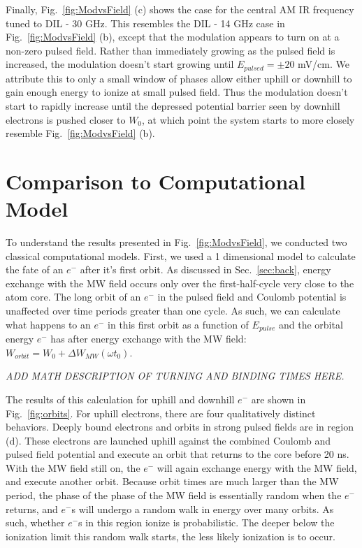 \documentclass[aps,pra,preprint,groupedaddress]{revtex4-1}
\begin{document}
Finally, Fig.~\ref{fig:ModvsField} (c) shows the case for the central AM IR frequency tuned to DIL - 30 GHz. This resembles the DIL - 14 GHz case in Fig.~\ref{fig:ModvsField} (b), except that the modulation appears to turn on at a non-zero pulsed field. Rather than immediately growing as the pulsed field is increased, the modulation doesn't start growing until $E_{pulsed} = \pm 20$ mV/cm. We attribute this to only a small window of phases allow either uphill or downhill to gain enough energy to ionize at small pulsed field. Thus the modulation doesn't start to rapidly increase until the depressed potential barrier seen by downhill electrons is pushed closer to $W_0$, at which point the system starts to more closely resemble Fig.~\ref{fig:ModvsField} (b).

\section{\label{sec:disc} Comparison to Computational Model}

To understand the results presented in Fig.~\ref{fig:ModvsField}, we conducted two classical computational models. First, we used a 1 dimensional model to calculate the fate of an $e^-$ after it's first orbit. As discussed in Sec.~\ref{sec:back}, energy exchange with the MW field occurs only over the first-half-cycle very close to the atom core. The long orbit of an $e^-$ in the pulsed field and Coulomb potential is unaffected over time periods greater than one cycle. As such, we can calculate what happens to an $e^-$ in this first orbit as a function of $E_{pulse}$ and the orbital energy $e^-$ has after energy exchange with the MW field: $W_{orbit} = W_0 + \Delta W_{MW}(\omega t_0)$.

\emph{ADD MATH DESCRIPTION OF TURNING AND BINDING TIMES HERE.}

The results of this calculation for uphill and downhill $e^-$ are shown in Fig.~\ref{fig:orbits}. For uphill electrons, there are four qualitatively distinct behaviors. Deeply bound electrons and orbits in strong pulsed fields are in region (d). These electrons are launched uphill against the combined Coulomb and pulsed field potential and execute an orbit that returns to the core before 20 ns. With the MW field still on, the $e^-$ will again exchange energy with the MW field, and execute another orbit. Because orbit times are much larger than the MW period, the phase of the phase of the MW field is essentially random when the $e^-$ returns, and $e^-$s will undergo a random walk in energy over many orbits. As such, whether $e^-$s in this region ionize is probabilistic. The deeper below the ionization limit this random walk starts, the less likely ionization is to occur.
\end{document}
